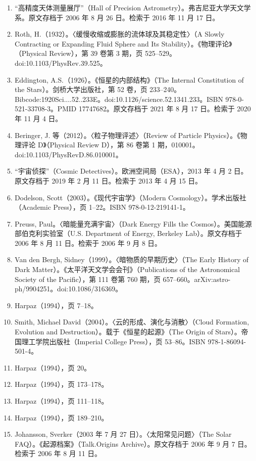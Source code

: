 \begin{enumerate}
  \item “高精度天体测量展厅”（Hall of Precision Astrometry）。弗吉尼亚大学天文学系。原文存档于 2006 年 8 月 26 日。检索于 2016 年 11 月 17 日。
  \item Roth, H.（1932）。〈缓慢收缩或膨胀的流体球及其稳定性〉（A Slowly Contracting or Expanding Fluid Sphere and Its Stability）。《物理评论》（Physical Review），第 39 卷第 3 期，页 525–529。doi:10.1103/PhysRev.39.525。
  \item Eddington, A.S.（1926）。《恒星的内部结构》（The Internal Constitution of the Stars）。剑桥大学出版社，第 52 卷，页 233–240。Bibcode:1920Sci....52..233E。doi:10.1126/science.52.1341.233。ISBN 978-0-521-33708-3。PMID 17747682。原文存档于 2021 年 8 月 17 日。检索于 2020 年 11 月 4 日。%
  \item Beringer, J. 等（2012）。〈粒子物理评述〉（Review of Particle Physics）。《物理评论 D》（Physical Review D），第 86 卷第 1 期，010001。doi:10.1103/PhysRevD.86.010001。
  \item “宇宙侦探”（Cosmic Detectives）。欧洲空间局（ESA），2013 年 4 月 2 日。原文存档于 2019 年 2 月 11 日。检索于 2013 年 4 月 15 日。
  \item Dodelson, Scott（2003）。《现代宇宙学》（Modern Cosmology）。学术出版社（Academic Press），页 1–22。ISBN 978-0-12-219141-1。
  \item Preuss, Paul。〈暗能量充满宇宙〉（Dark Energy Fills the Cosmos）。美国能源部伯克利实验室（U.S. Department of Energy, Berkeley Lab）。原文存档于 2006 年 8 月 11 日。检索于 2006 年 9 月 8 日。
  \item Van den Bergh, Sidney（1999）。〈暗物质的早期历史〉（The Early History of Dark Matter）。《太平洋天文学会会刊》（Publications of the Astronomical Society of the Pacific），第 111 卷第 760 期，页 657–660。arXiv:astro-ph/9904251。doi:10.1086/316369。
  \item Harpaz（1994），页 7–18。
  \item Smith, Michael David（2004）。〈云的形成、演化与消散〉（Cloud Formation, Evolution and Destruction）。载于《恒星的起源》（The Origin of Stars）。帝国理工学院出版社（Imperial College Press），页 53–86。ISBN 978-1-86094-501-4。
  \item Harpaz（1994），页 20。
  \item Harpaz（1994），页 173–178。
  \item Harpaz（1994），页 111–118。
  \item Harpaz（1994），页 189–210。
  \item Johansson, Sverker（2003 年 7 月 27 日）。〈太阳常见问题〉（The Solar FAQ）。《起源档案》（Talk.Origins Archive）。原文存档于 2006 年 9 月 7 日。检索于 2006 年 8 月 11 日。

\end{enumerate}
